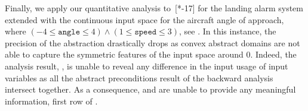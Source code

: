 \begin{table}[t]
  \caption{Quantitative input usage for~.}
  \centering
\end{table}

Finally, we apply our quantitative analysis to~[*-17] for the landing alarm system extended with the  continuous input space for the aircraft angle of approach, where $(-4 \le \texttt{angle} \le 4) \land (1 \le \texttt{speed} \le 3)$, see .
In this instance, the precision of the abstraction drastically drops as convex abstract domains are not able to capture the symmetric features of the input space around 0.
Indeed, the analysis result, \cf{} , is unable to reveal any difference in the input usage of input variables as all the abstract preconditions result of the backward analysis intersect together.
As a consequence, \outcomesname{} and \rangename{} are unable to provide any meaningful information, first row of .

